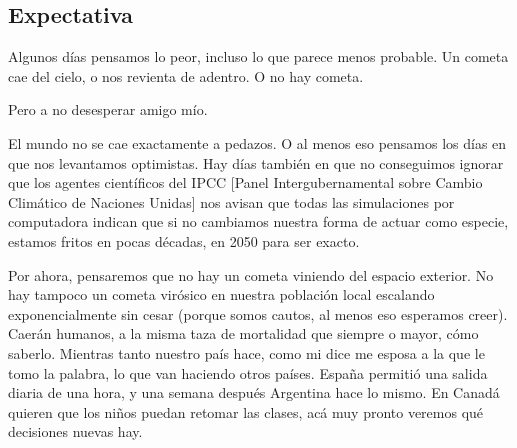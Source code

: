 \subsection{Expectativa}

Algunos días pensamos lo peor, incluso lo que parece menos probable.
Un cometa cae del cielo, o nos revienta de adentro. O no hay cometa.

Pero a no desesperar amigo mío.

El mundo no se cae exactamente a pedazos. O al menos eso
pensamos los días en que nos levantamos optimistas. Hay días también en
que no conseguimos ignorar que los agentes científicos del IPCC [Panel
Intergubernamental sobre Cambio Climático de Naciones Unidas] nos avisan
que todas las simulaciones por computadora indican que si no cambiamos
nuestra forma de actuar como especie, estamos fritos en pocas décadas, en 2050 para ser exacto.

Por ahora, pensaremos que no hay un cometa viniendo del espacio exterior. 
No hay tampoco un cometa virósico en nuestra población local 
escalando exponencialmente sin cesar (porque somos cautos, al menos eso esperamos creer). 
Caerán humanos, a la misma taza de mortalidad que siempre o mayor, cómo saberlo. 
Mientras tanto nuestro país hace, como mi dice me esposa a la que le tomo la palabra, 
lo que van haciendo otros países. 
España permitió una salida diaria de una hora, y una semana después Argentina hace lo mismo. 
En Canadá quieren que los niños puedan retomar las clases, acá muy pronto veremos qué decisiones nuevas hay. 

